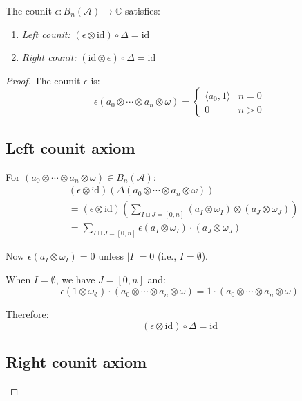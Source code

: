 \begin{theorem}\label{thm:counit-axioms}
The counit $\epsilon: \bar{B}_n(\mathcal{A}) \to \mathbb{C}$ satisfies:
\begin{enumerate}
\item \emph{Left counit:} $(\epsilon \otimes \text{id}) \circ \Delta = \text{id}$
\item \emph{Right counit:} $(\text{id} \otimes \epsilon) \circ \Delta = \text{id}$
\end{enumerate}
\end{theorem}

\begin{proof}

The counit $\epsilon$ is:
\[\epsilon(a_0 \otimes \cdots \otimes a_n \otimes \omega) =
\begin{cases}
\langle a_0, 1 \rangle & n = 0 \\
0 & n > 0
\end{cases}\]

\subsection*{Left counit axiom}

For $(a_0 \otimes \cdots \otimes a_n \otimes \omega) \in \bar{B}_n(\mathcal{A})$:
\begin{align*}
&(\epsilon \otimes \text{id})(\Delta(a_0 \otimes \cdots \otimes a_n \otimes \omega)) \\
&= (\epsilon \otimes \text{id})\left(\sum_{I \sqcup J = [0,n]} (a_I \otimes \omega_I) \otimes (a_J \otimes \omega_J)\right) \\
&= \sum_{I \sqcup J = [0,n]} \epsilon(a_I \otimes \omega_I) \cdot (a_J \otimes \omega_J)
\end{align*}

Now $\epsilon(a_I \otimes \omega_I) = 0$ unless $|I| = 0$ (i.e., $I = \emptyset$).

When $I = \emptyset$, we have $J = [0,n]$ and:
\[\epsilon(1 \otimes \omega_{\emptyset}) \cdot (a_0 \otimes \cdots \otimes a_n \otimes \omega) = 1 \cdot (a_0 \otimes \cdots \otimes a_n \otimes \omega)\]

Therefore:
\[(\epsilon \otimes \text{id}) \circ \Delta = \text{id}\]

\subsection*{Right counit axiom}


\end{proof}
